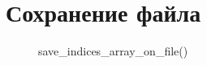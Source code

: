 \documentclass[12pt, a4paper]{article}
\begin{document}






\newpage
\section{Сохранение файла}


\begin{figure}[H]
    \caption{save\_indices\_array\_on\_file()}
\end{figure}
\end{document}
